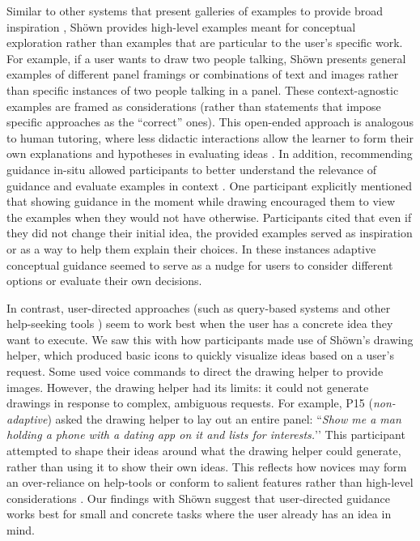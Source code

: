 Similar to other systems that present galleries of examples to provide broad inspiration \cite{kang2018paragon,Lee2009,marks1997design}, Sh{\"o}wn provides high-level examples meant for conceptual exploration rather than examples that are particular to the user's specific work. For example, if a user wants to draw two people talking, Sh{\"o}wn presents general examples of different panel framings or combinations of text and images rather than specific instances of two people talking in a panel. These context-agnostic examples are framed as considerations (rather than statements that impose specific approaches as the ``correct'' ones). This open-ended approach is analogous to human tutoring, where less didactic interactions allow the learner to form their own explanations and hypotheses in evaluating ideas \cite{Chi2010}. 
In addition, recommending guidance in-situ allowed participants to better understand the relevance of guidance and evaluate examples in context \cite{schon1984reflective}. One participant explicitly mentioned that showing guidance in the moment while drawing encouraged them to view the examples when they would not have otherwise. Participants cited that even if they did not change their initial idea, the provided examples served as inspiration or as a way to help them explain their choices. In these instances adaptive conceptual guidance seemed to serve as a nudge for users to consider different options or evaluate their own decisions. 

In contrast, user-directed approaches (such as query-based systems and other help-seeking tools \cite{fraser2019replay,Huang2019, Satyanarayan2014}) seem to work best when the user has a concrete idea they want to execute. We saw this with how participants made use of Sh{\"o}wn's drawing helper, which produced basic icons to quickly visualize ideas based on a user's request. Some used voice commands to direct the drawing helper to provide images. However, the drawing helper had its limits: it could not generate drawings in response to complex, ambiguous requests. For example, P15 (\textit{non-adaptive}) asked the drawing helper to lay out an entire panel: ``\textit{Show me a man holding a phone with a dating app on it and lists for interests.}’’ 
This participant attempted to shape their ideas around what the drawing helper could generate, rather than using it to show their own ideas. This reflects how novices may form an over-reliance on help-tools or conform to salient features rather than high-level considerations \cite{jansson1991design,javadi2012impact,marsh1996examples,Smith1993}. Our findings with Sh{\"o}wn suggest that user-directed guidance works best for small and concrete tasks where the user already has an idea in mind.

